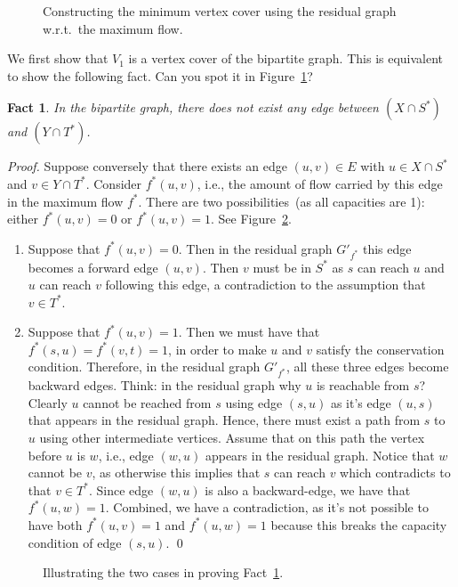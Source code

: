 \documentclass[letterpaper,11pt]{article}
\theoremstyle{mytheorem}
\newtheorem{fact}{Fact}
\begin{document}
\begin{figure}[h]
\centering{}
\caption{Constructing the minimum vertex cover using the residual graph w.r.t.\ the maximum flow.}
\label{fig:residual}
\end{figure}

We first show that $V_1$ is a vertex cover of the bipartite graph. This is equivalent to show
the following fact.  Can you spot it in Figure~\ref{fig:residual}?
\begin{fact} \label{noedges}
In the bipartite graph, there does not exist any edge between $(X\cap S^*)$ and $(Y\cap T^*)$. 
\end{fact}
\emph{Proof.} Suppose conversely that there exists an edge $(u,v)\in E$ with $u\in X\cap S^*$ and $v\in Y\cap T^*$.
Consider $f^*(u,v)$, i.e., the amount of flow carried by this edge in the maximum flow $f^*$.
There are two possibilities~(as all capacities are 1): either $f^*(u,v) = 0$ or $f^*(u,v) = 1$. See Figure~\ref{fig:proof}.
\vspace*{-\topsep}
\begin{enumerate}
\item Suppose that $f^*(u,v) = 0$. Then in the residual graph $G'_{f^*}$ this edge becomes a forward edge $(u,v)$.
Then $v$ must be in $S^*$ as $s$ can reach $u$ and $u$ can reach $v$ following this edge, a contradiction
to the assumption that $v\in T^*$.
\item Suppose that $f^*(u,v) = 1$. Then we must have that $f^*(s,u) = f^*(v,t) = 1$, in order to make $u$ and $v$ satisfy
the conservation condition. Therefore, in the residual graph $G'_{f^*}$, all these three edges become backward edges.
Think: in the residual graph why $u$ is reachable from $s$?
Clearly $u$ cannot be reached from $s$ using edge $(s,u)$ as it's edge $(u,s)$ that appears in the residual graph.
Hence, there must exist a path from $s$ to $u$ using other intermediate vertices.
Assume that on this path the vertex before $u$ is $w$, i.e., edge $(w,u)$ appears in the residual graph.
Notice that $w$ cannot be $v$, as otherwise this implies that $s$ can reach $v$ which contradicts to that $v\in T^*$.
Since edge $(w,u)$ is also a backward-edge, we have that $f^*(u,w) = 1$.
Combined, we have a contradiction, as it's not possible to have both $f^*(u,v) = 1$ and $f^*(u,w) = 1$
because this breaks the capacity condition of edge $(s,u)$. \qed
\end{enumerate}

\begin{figure}[t]
\centering{}
\caption{Illustrating the two cases in proving Fact~\ref{noedges}.}
\label{fig:proof}
\end{figure}
\end{document}
